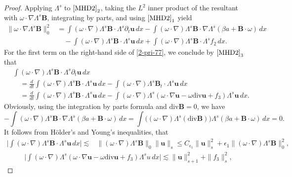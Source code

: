\documentclass[12pt, reqno]{amsart}
\numberwithin{equation}{section}
\numberwithin{equation}{section}
\numberwithin{equation}{section}
\numberwithin{equation}{section}
\theoremstyle{remark}
\def\u{ \mathbf{u} }
\def\b{ \mathbf{B} }
\begin{document}
\begin{proof}
Applying $\Lambda^{s}$ to $\eqref{MHD2}_{2}$, taking the  $L^2$ inner product of the resultant with $\omega\cdot\nabla\Lambda^{s}\b$,
integrating by parts, and using $\eqref{MHD2}_{1}$ yield
\begin{equation}\begin{split}\label{2-pri-77}
\|\omega\cdot\nabla\Lambda^{s}\b\|_0^2
&=\int (\omega\cdot\nabla)\Lambda^{s}\b\cdot\Lambda^{s}\partial_t\u \,dx-\int(\omega\cdot\nabla)\Lambda^{s}\b\cdot\nabla\Lambda^{s}(\beta a+ \b\cdot\omega)\,dx
\\&\quad-\int (\omega\cdot\nabla)\Lambda^{s}\b\cdot\Lambda^{s}\u \,dx+\int (\omega\cdot\nabla)\Lambda^{s}\b\cdot\Lambda^{s}f_2\,dx.
\end{split}\end{equation}
For the first term on the right-hand side of \eqref{2-pri-77}, we conclude  by $\eqref{MHD2}_3$ that
\begin{equation*}\begin{split}\label{pri-17}
&\int(\omega\cdot\nabla)\Lambda^{s}\b\cdot\Lambda^{s}\partial_t\u \,dx
\\
&\quad=\frac{d}{dt}\int(\omega\cdot\nabla)\Lambda^{s}\b\cdot \Lambda^{s}\u \,dx-\int(\omega\cdot\nabla)\Lambda^{s}\b_t\cdot\Lambda^{s}\u \,dx\\
&\quad=\frac{d}{dt}\int(\omega\cdot\nabla)\Lambda^{s}\b\cdot \Lambda^{s}\u \,dx-\int(\omega\cdot\nabla)\Lambda^{s}(\omega\cdot\nabla \u-\omega\text{div}\u+f_3)\Lambda^{s}\u \,dx.
\end{split}\end{equation*}
Obviously, using the integration by
parts formula and  $\text{div}\b=0$, we have
$$
-\int(\omega\cdot\nabla)\Lambda^{s}\b\cdot\nabla\Lambda^{s}(\beta a+ \b\cdot\omega)\,dx=\int\big((\omega\cdot\nabla)\Lambda^{s}(\text{div}\b)\big)\Lambda^{s}(\beta a+ \b\cdot\omega)\,dx=0.
$$
It follows from H\"{o}lder's and Young's inequalities, that
\begin{align*}
 \big|\int(\omega\cdot\nabla)\Lambda^{s}\b\cdot\Lambda^{s}\u \,dx\big|\lesssim&\|(\omega\cdot\nabla)\Lambda^{s}\b\|_0\|\u\|_{s}
  \leq C_{\epsilon_1}\|\u\|^2_{s}+\epsilon_1\|(\omega\cdot\nabla)\Lambda^{s}\b\|_0^2,
\end{align*}
\begin{align*}
  \big|\int(\omega\cdot\nabla)\Lambda^{s}(\omega\cdot\nabla \u-\omega\text{div}\u+f_3)\Lambda^{s}u\,dx\big|\lesssim \|\u\|^2_{s+1}+\|f_3\|^2_{s},

\end{align*}
\end{proof}
\end{document}
